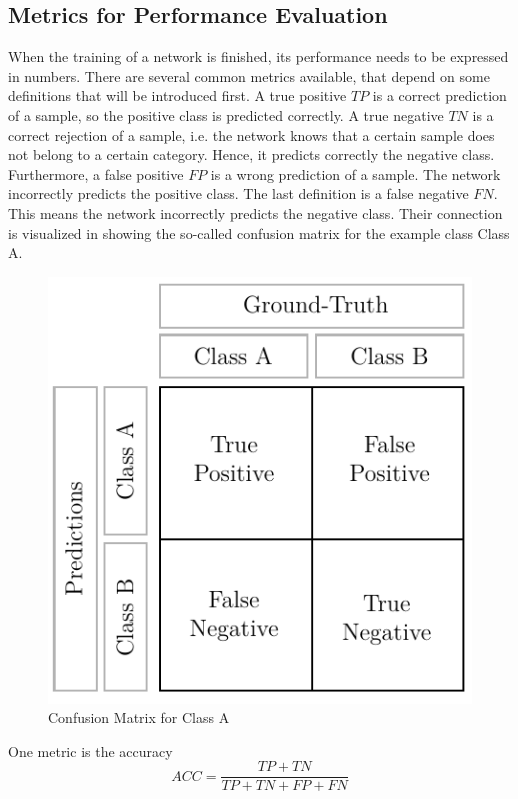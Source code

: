 \subsection{Metrics for Performance Evaluation}
\label{sec:neural-networks-metrics}
When the training of a network is finished, its performance needs to be expressed in numbers.
There are several common metrics available, that depend on some definitions that will be introduced first.
A true positive $TP$ is a correct prediction of a sample, so the positive class is predicted correctly.
A true negative $TN$ is a correct rejection of a sample, i.e. the network knows that a certain sample does not belong to a certain category.
Hence, it predicts correctly the negative class.
Furthermore, a false positive $FP$ is a wrong prediction of a sample.
The network incorrectly predicts the positive class.
The last definition is a false negative $FN$.
This means the network incorrectly predicts the negative class.
Their connection is visualized in  showing the so-called confusion matrix\cite{Fawcett:2006:IRA:1159473.1159475} for the example class Class A.
\begin{figure}
	\centering
	\includegraphics[]{images/confusion_matrix.pdf}
	\caption[Confusion Matrix]{Confusion Matrix for Class A}
	\label{fig:confusion-matrix}
\end{figure}
One metric is the accuracy
\begin{equation}
	ACC = \frac{TP + TN}{TP + TN + FP + FN}
\end{equation}
